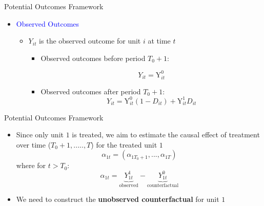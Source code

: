 \documentclass[dvipsnames,hyperref={pdfpagelabels=false}]{beamer}
\begin{document}
\begin{frame}{Potential Outcomes Framework}{}
\begin{itemize}

\item \textcolor{blue}{Observed Outcomes}
\vspace{0.2cm}
\begin{itemize}
\item $Y_{it}$ is the observed outcome for unit $i$ at time $t$
\vspace{0.2cm}	
\begin{itemize}
\item Observed outcomes before period $T_0+1$:

\begin{equation*}
Y_{it}=\mathrm{Y}^{0}_{it}
\end{equation*}
\item Observed outcomes after period $T_0+1$: 
\begin{equation*}
Y_{it}=\mathrm{Y}^{0}_{it}(1-D_{it})+\mathrm{Y}^{1}_{it}D_{it}
\end{equation*}
\end{itemize}
\end{itemize}


\end{itemize}
\end{frame}





\begin{frame}{Potential Outcomes Framework}{}
\begin{itemize}
\item Since only unit $1$ is treated, we aim to estimate the causal effect of treatment over time ($T_{0}+1,.....,T$) for the treated unit $1$
\begin{equation*}
\alpha_{1t}=(\alpha_{1T_{0}+1},...,\alpha_{1T})
\end{equation*}
where for $t>T_0$:
\begin{equation*}
\alpha_{1t}=\underbrace{Y^1_{1t}}_{\text{observed}}-\underbrace{Y^0_{1t}}_{\text{counterfactual}}
\end{equation*}
\vspace{0.2cm}
\item We need to construct the \textbf{unobserved counterfactual} for unit $1$
\end{itemize}
\end{frame}
\end{document}
